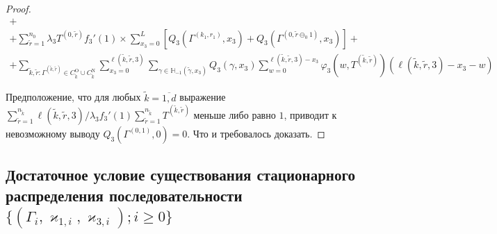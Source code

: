 \documentclass[a4paper,12pt,russian]{extarticle}
\begin{document}
\begin{proof}
\begin{multline}
 +\\+ \sum_{\tilde{r}=1}^{n_0} \lambda_3 T^{(0,\tilde{r})} f_3'(1)  \times \sum_{x_3=0}^{L} \left[ Q_3(\Gamma^{(k_1,r_1)},x_3) + Q_3(\Gamma^{(0,\tilde{r}\ominus_0 1)},x_3) \right]   +\\+  \sum_{\tilde{k},\tilde{r}\colon \Gamma^{(\tilde{k}, \tilde{r})} \in C_{\tilde{k}}^{\mathrm{O}}\cup C_{\tilde{k}}^{\mathrm{N}}} \sum_{x_3=0}^{\ell(\tilde{k},\tilde{r},3)}\sum_{\gamma \in {\mathbb H}_{-1}(\tilde{\gamma},x_3)} Q_3(\gamma,x_3) \sum_{w=0}^{\ell(\tilde{k},\tilde{r},3) - x_3} \varphi_3(w,T^{(\tilde{k},\tilde{r})}) (\ell(\tilde{k},\tilde{r},3)-x_3 - w)
 \label{neccessary:to:paste:one}
\end{multline}


Предположение, что для любых $\tilde{k}=\overline{1,d}$  выражение $\sum_{\tilde{r} = 1}^{n_{\tilde{k}}}\ell(\tilde{k},\tilde{r},3) \big/\lambda_3 f_3'(1) \sum_{\tilde{r} = 1}^{n_{\tilde{k}}} T^{(\tilde{k},\tilde{r})}   $ меньше либо равно $1$, приводит к невозможному выводу $Q_3(\Gamma^{(0,1)},0) = 0$. Что и требовалось доказать.

\end{proof}

















\subsection{Достаточное условие существования стационарного распределения последовательности $\{(\Gamma_i, \varkappa_{1,i},\varkappa_{3,i}); i \geqslant 0\}$}
\end{document}
